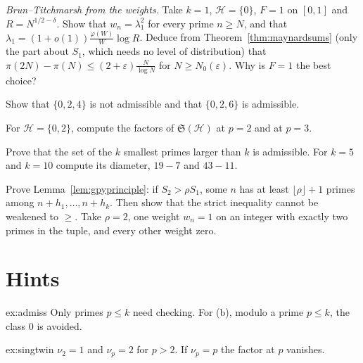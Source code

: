\begin{exercise}[$\star\star\star$]\label{ex:btsieve}
\emph{Brun--Titchmarsh from the weights.} Take $k=1$, $\mathcal H=\{0\}$, $F=1$ on $[0,1]$ and $R=N^{1/2-\delta}$. Show that $w_n=\lambda_1^2$ for every prime $n\ge N$, and that $\lambda_1=(1+o(1))\frac{\varphi(W)}W\log R$. Deduce from Theorem~\ref{thm:maynardsums} (only the part about $S_1$, which needs no level of distribution) that $\pi(2N)-\pi(N)\le(2+\varepsilon)\frac N{\log N}$ for $N\ge N_0(\varepsilon)$. Why is $F=1$ the best choice?
\end{exercise}

\begin{exercise}[$\star$]\label{ex:v14-extra-08-1}
Show that $\{0,2,4\}$ is not admissible and that $\{0,2,6\}$ is admissible.
\end{exercise}

\begin{exercise}[$\star$]\label{ex:v14-extra-08-2}
For $\mathcal H=\{0,2\}$, compute the factors of $\mathfrak S(\mathcal H)$ at $p=2$ and at $p=3$.
\end{exercise}

\begin{exercise}[$\star\star$]\label{ex:v14-extra-08-3}
Prove that the set of the $k$ smallest primes larger than $k$ is admissible. For $k=5$ and $k=10$ compute its diameter, $19-7$ and $43-11$.
\end{exercise}

\begin{exercise}[$\star\star\star$]\label{ex:v14-extra-08-4}
Prove Lemma~\ref{lem:gpyprinciple}: if $S_2>\rho S_1$, some $n$ has at least $\lfloor\rho\rfloor+1$ primes among $n+h_1,\dots,n+h_k$. Then show that the strict inequality cannot be weakened to $\ge$. Take $\rho=2$, one weight $w_n=1$ on an integer with exactly two primes in the tuple, and every other weight zero.
\end{exercise}

\section{Hints}

\begin{hint}{ex:admiss}
Only primes $p\le k$ need checking. For (b), modulo a prime $p\le k$, the class $0$ is avoided.
\end{hint}

\begin{hint}{ex:singtwin}
$\nu_2=1$ and $\nu_p=2$ for $p>2$. If $\nu_p=p$ the factor at $p$ vanishes.
\end{hint}

